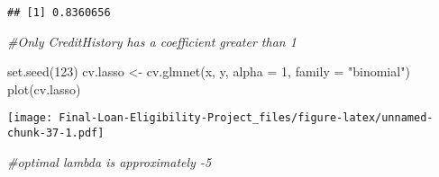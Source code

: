 \documentclass[
]{article}
\newenvironment{Shaded}{\begin{snugshade}}{\end{snugshade}}
\newcommand{\AttributeTok}[1]{\textcolor[rgb]{0.77,0.63,0.00}{#1}}
\newcommand{\CommentTok}[1]{\textcolor[rgb]{0.56,0.35,0.01}{\textit{#1}}}
\newcommand{\DecValTok}[1]{\textcolor[rgb]{0.00,0.00,0.81}{#1}}
\newcommand{\FloatTok}[1]{\textcolor[rgb]{0.00,0.00,0.81}{#1}}
\newcommand{\FunctionTok}[1]{\textcolor[rgb]{0.00,0.00,0.00}{#1}}
\newcommand{\NormalTok}[1]{#1}
\newcommand{\OtherTok}[1]{\textcolor[rgb]{0.56,0.35,0.01}{#1}}
\newcommand{\SpecialCharTok}[1]{\textcolor[rgb]{0.00,0.00,0.00}{#1}}
\newcommand{\StringTok}[1]{\textcolor[rgb]{0.31,0.60,0.02}{#1}}
\begin{document}
\begin{Shaded}
\end{Shaded}

\begin{verbatim}
## [1] 0.8360656
\end{verbatim}

\begin{Shaded}
\begin{Highlighting}[]
\CommentTok{\#Only CreditHistory has a coefficient greater than 1}
\end{Highlighting}
\end{Shaded}

\begin{Shaded}
\begin{Highlighting}[]
\FunctionTok{set.seed}\NormalTok{(}\DecValTok{123}\NormalTok{)}
\NormalTok{cv.lasso }\OtherTok{\textless{}{-}} \FunctionTok{cv.glmnet}\NormalTok{(x, y, }\AttributeTok{alpha =} \DecValTok{1}\NormalTok{, }\AttributeTok{family =} \StringTok{"binomial"}\NormalTok{)}
\FunctionTok{plot}\NormalTok{(cv.lasso)}
\end{Highlighting}
\end{Shaded}

\texttt{[image: Final-Loan-Eligibility-Project\_files/figure-latex/unnamed-chunk-37-1.pdf]}

\begin{Shaded}
\begin{Highlighting}[]
\CommentTok{\#optimal lambda is approximately {-}5}
\end{Highlighting}
\end{Shaded}
\end{document}
